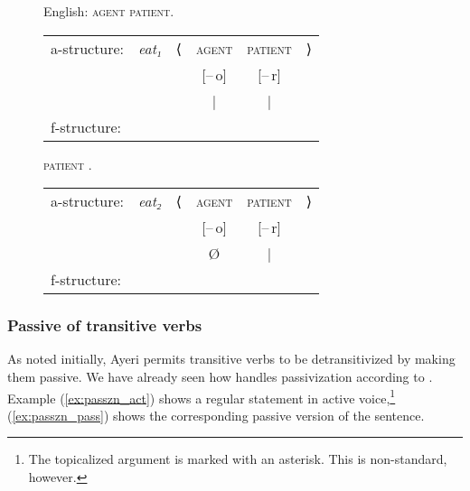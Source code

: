 \begin{figure}[h]
\pex\label{ex:engpassive}%
English:
\a \textsc{agent}  \textsc{patient}.\medskip

\begin{tabular}[t]{@{} l >{\itshape}l l c c r}
a-structure:
	& eat₁
	& ⟨
	& \textsc{agent}
	& \textsc{patient}
	& ⟩
	\\
%
	& %
	& %
	& [–\,o]
	& [–\,r]
	& %
	\\

%
	& %
	& %
	& |
	& |
	& %
	\\

f-structure:
	& %
	& %
	& \Subj
	& \Obj
	& %
	\\
\end{tabular}

\a \textsc{patient} .\medskip

\begin{tabular}[t]{@{} l >{\itshape}l l c c r}
a-structure:
	& eat₂
	& ⟨
	& \textsc{agent}
	& \textsc{patient}
	& ⟩
	\\
%
	& %
	& %
	& [–\,o]
	& [–\,r]
	& %
	\\

%
	& %
	& %
	& Ø
	& |
	& %
	\\

f-structure:
	& %
	& %
	& %
	& \Subj
	& %
	\\
\end{tabular}
\xe
\end{figure}

\subsubsection{Passive of transitive verbs}

As noted initially, Ayeri permits transitive verbs to be detransitivized by
making them passive. We have already seen how \Lfg{} handles passivization
according to \citet{bresnan2016}. Example (\ref{ex:passzn_act}) shows a regular
statement in active voice,\footnote{The topicalized argument is marked with an
asterisk. This is non-standard, however.} (\ref{ex:passzn_pass}) shows the
corresponding passive version of the sentence.

